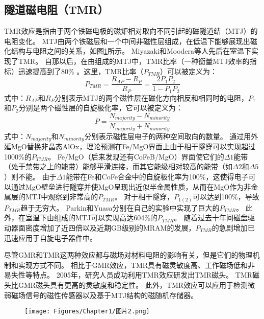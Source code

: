 \subsection{隧道磁电阻（TMR）}
TMR效应是指由于两个铁磁电极的磁矩相对取向不同引起的磁隧道结（MTJ）的电阻变化。
MTJ由两个铁磁层和一个中间非磁性层组成，在低温下能够展现出磁化结构与电阻之间的关系\cite{hirohata2020review}，如图\ref{图1.2}所示。
Miyazaki\cite{miyazaki1995giant}和Moodera\cite{moodera1995large}等人先后在室温下实现了TMR。
自那以后，在由组成的MTJ中，TMR比率（一种衡量MTJ效率的指标）迅速提高到了80\% \cite{wei200780}。这里，TMR比率（$P_{TMR}$）可以被定义为\cite{hirohata2020review}：
\begin{equation}
    P_{TMR} = \frac{R_{AP}-R_P}{R_P} = \frac{2P_1P_2}{1-P_1P_2}
    \label{公式1-2}
\end{equation}
式中：$R_{AP}$和$R_P$分别表示MTJ的两个磁性层在磁化方向相反和相同时的电阻，$P_1$和$P_2$分别是两个磁性层的自旋极化率，它可以被定义为：
\begin{equation}
    P = \frac{N_{majority}-N_{minority}}{N_{majority}+N_{minority}}
    \label{公式1-3}
\end{equation}
式中：$N_{majority}$和$N_{minority}$分别表示磁性层电子的两种空间取向的数量。
通过用外延MgO替换非晶态AlOx，理论预测在Fe/MgO界面上由于相干隧穿可以实现超过1000\%的$P_{TMR}$\cite{butler2001spin,mathon2001theory}。
Fe/MgO（后来发现还有CoFeB/MgO）界面使它们的$\Delta 1$能带（处于禁带之上的能带）能够平滑连接，而其它能级相对较高的能带（如$\Delta 2$和$\Delta 5$）则不能。
由于$\Delta 1$能带在Fe和CoFe合金中的自旋极化率为100\%，这使得电子可以通过MgO壁垒进行隧穿并使MgO呈现出近似半金属性质，从而在MgO作为非金属层的MTJ中观察到非常高的$P_{TMR}$。
对于相干隧穿，$P_{1(2)}$可以达到100\%，导致$P_{TMR}$趋于无穷大。
Parkin\cite{parkin1991giant}和Yuasa\cite{yuasa2004giant}分别在自己的实验中实现了巨大的$P_{TMR}$。
此外，在室温下由组成的MTJ可以实现高达604\%的$P_{TMR}$\cite{ikeda2008tunnel}。
随着过去十年间磁盘驱动器面密度增加了近四倍以及近期GB级别的MRAM的发展，$P_{TMR}$的急剧增加已迅速应用于自旋电子器件中。\par
尽管GMR和TMR这两种效应都与磁场对材料电阻的影响有关，但是它们的物理机制和实现方式不同。
相比于GMR效应，TMR具有磁灵敏度高、工作磁场低和非易失性等特点。
2005年，研究人员成功利用TMR效应研发出TMR磁头。
TMR磁头比GMR磁头具有更高的灵敏度和稳定性。
此外，TMR效应可以应用于检测微弱磁场信号的磁性传感器以及基于MTJ结构的磁随机存储器。
\begin{figure}[h]
    \centering
    \texttt{[image: Figures/Chapter1/图片2.png]}
    \label{图1.2}
\end{figure}
